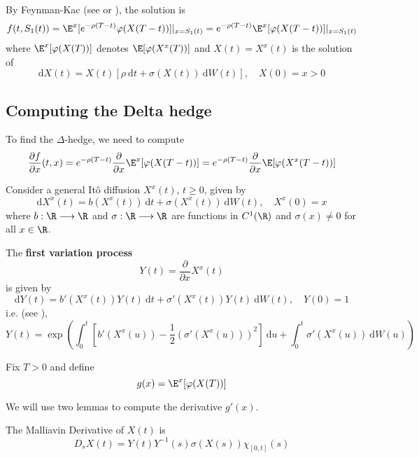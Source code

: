 By Feynman-Kac (see \cite[Theorem 6.6.3]{Silva23stochastic} or \cite[Theorem 6.4.3]{shreve2004stochastic}), the solution is
\begin{equation*}
f(t, S_1(t)) = \E^x [e^{-\rho(T-t)} \varphi(X(T-t))] |_{x = S_1(t)} = e^{-\rho(T-t)} \E^x  [\varphi(X(T-t))] |_{x = S_1(t)}
\end{equation*}
where $\E^x [\varphi(X(T))]$ denotes $\E [\varphi(X^x(T))]$ and $X(t) = X^x(t)$ is the solution of
\begin{equation*}
\mathrm{d} X(t) = X(t) [\rho ~\mathrm{d}t + \sigma(X(t)) ~\mathrm{d}W(t)], \quad X(0) = x > 0
\end{equation*}

\subsection*{Computing the Delta hedge}

To find the $\Delta$-hedge, we need to compute
\begin{equation*}
\begin{aligned}
	\frac{\partial f}{\partial x} (t, x) = e^{-\rho (T-t)} \frac{\partial}{\partial x} \E^x[\varphi(X(T-t))] = e^{-\rho (T-t)} \frac{\partial}{\partial x} \E[\varphi(X^x(T-t))]
\end{aligned}
\end{equation*}

Consider a general Itô diffusion $X^x(t)$, $t \ge 0$, given by 
\[
\mathrm{d} X^x(t) = b(X^x(t))~\mathrm{d}t + \sigma(X^x(t))~\mathrm{d}W(t), \quad X^x(0) = x
\]
where $b : \R \longrightarrow \R$ and $\sigma : \R \longrightarrow \R$ are functions in $C^1(\R)$ and $\sigma(x) \neq 0$ for all $x \in \R$.

The \textbf{first variation process}
\[
	Y(t) = \frac{\partial}{\partial x} X^x(t)
\]
is given by
\[
\mathrm{d}Y(t) = b'(X^x(t)) Y(t) ~\mathrm{d}t + \sigma'(X^x(t)) Y(t)~\mathrm{d}W(t), \quad Y(0) = 1
\]
i.e. (see \cite{kunita1997stochastic}),
\[
Y(t) = \exp \left( \int_0^t \left[ b'(X^x(u)) - \frac{1}{2} (\sigma'(X^x(u)))^2 \right] ~\mathrm{d}u + \int_0^t \sigma'(X^x(u)) ~\mathrm{d}W(u) \right)
\]

Fix $T > 0$ and define
\[
g(x) = \E^x[\varphi(X(T))]
\]

We will use two lemmas to compute the derivative $g'(x)$.

\begin{lemma}\label{lm:202401241049}
The Malliavin Derivative of $X(t)$ is
\begin{equation*}
D_s X(t) = Y(t) Y^{-1}(s) \sigma(X(s))\chi_{[0,t]}(s)
\end{equation*}
\end{lemma}

